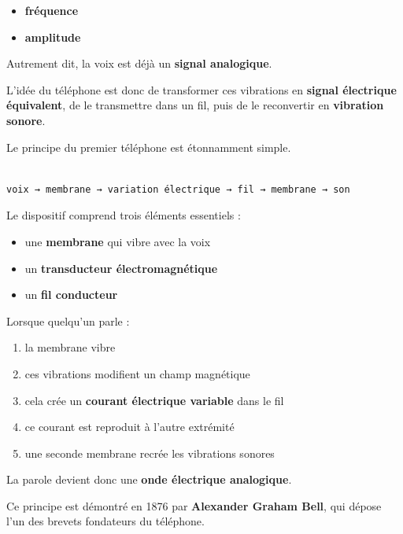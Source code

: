 \documentclass[
  french,
]{article}
\providecommand{\tightlist}{%
  \setlength{\itemsep}{0pt}\setlength{\parskip}{0pt}}
\begin{document}
\begin{itemize}
\tightlist
\item
  \textbf{fréquence}
\item
  \textbf{amplitude}
\end{itemize}

Autrement dit, la voix est déjà un \textbf{signal analogique}.

L'idée du téléphone est donc de transformer ces vibrations en
\textbf{signal électrique équivalent}, de le transmettre dans un fil,
puis de le reconvertir en \textbf{vibration sonore}.

Le principe du premier téléphone est étonnamment simple.

\begin{verbatim}

voix → membrane → variation électrique → fil → membrane → son
\end{verbatim}

Le dispositif comprend trois éléments essentiels :

\begin{itemize}
\tightlist
\item
  une \textbf{membrane} qui vibre avec la voix
\item
  un \textbf{transducteur électromagnétique}
\item
  un \textbf{fil conducteur}
\end{itemize}

Lorsque quelqu'un parle :

\begin{enumerate}
\def\labelenumi{\arabic{enumi}.}
\tightlist
\item
  la membrane vibre\\
\item
  ces vibrations modifient un champ magnétique\\
\item
  cela crée un \textbf{courant électrique variable} dans le fil\\
\item
  ce courant est reproduit à l'autre extrémité\\
\item
  une seconde membrane recrée les vibrations sonores
\end{enumerate}

La parole devient donc une \textbf{onde électrique analogique}.

Ce principe est démontré en 1876 par \textbf{Alexander Graham Bell}, qui
dépose l'un des brevets fondateurs du téléphone.
\end{document}
